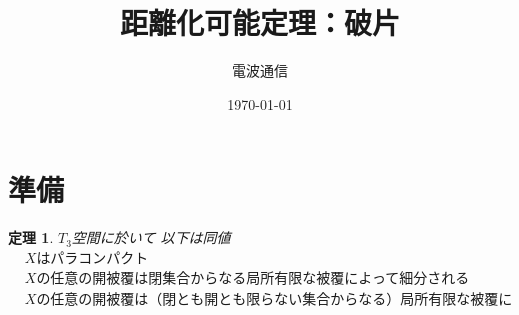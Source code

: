 \documentclass[leqno]{jsarticle}
\title{距離化可能定理：破片}
\author{電波通信}
\date{\today}
\newtheorem{thm}{定理}
\begin{document}
\maketitle

\section{準備}
\begin{thm}\label{pp}$T_3$空間に於いて
以下は同値
\begin{align}
&\mbox{$X$はパラコンパクト}\\ 
&\mbox{$X$の任意の開被覆は閉集合からなる局所有限な被覆によって細分される}\\
&\mbox{$X$の任意の開被覆は（閉とも開とも限らない集合からなる）局所有限な被覆によって細分される}
\end{align}
\end{thm}
\end{document}
